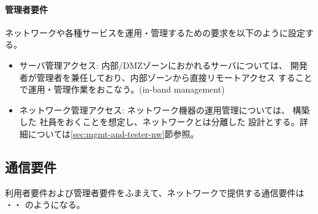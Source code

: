     \paragraph{管理者要件}
ネットワークや各種サービスを運用・管理するための要求を以下のように設定する。
\begin{itemize}
 \item サーバ管理アクセス: 内部/DMZゾーンにおかれるサーバについては、\yo
       開発者が管理者を兼任しており、内部ゾーンから直接リモートアクセス
       することで運用・管理作業をおこなう。(in-band management)
 \item ネットワーク管理アクセス: ネットワーク機器の運用管理については、
       構築した \tj 社員をおくことを想定し、\yo ネットワークとは分離した
       設計とする。詳細については\ref{sec:mgmt-and-tester-nw}節参照。
\end{itemize}

  \subsection{通信要件}
  \label{sec:network-requirements}

利用者要件および管理者要件をふまえて、ネットワークで提供する通信要件は
・・
 のようになる。

